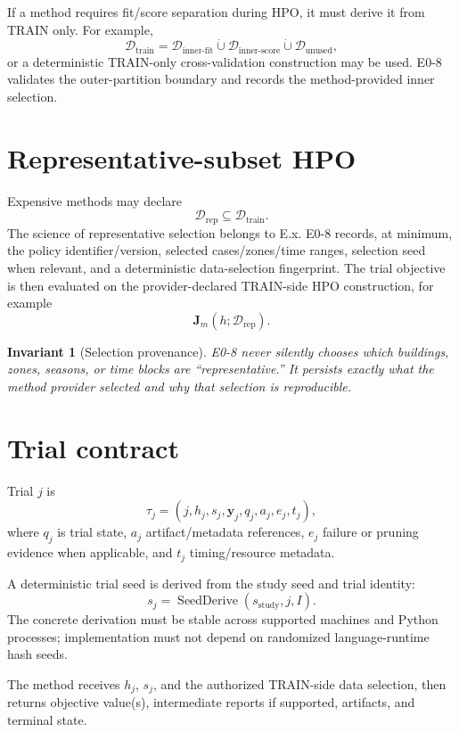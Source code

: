 \documentclass[11pt]{article}
\newcommand{\Trial}{\tau}
\newcommand{\Data}{\mathcal{D}}
\newtheorem{invariant}{Invariant}
\begin{document}
If a method requires fit/score separation during HPO, it must derive it from
TRAIN only. For example,
\[
\Data_{\mathrm{train}}
=
\Data_{\mathrm{inner\mbox{-}fit}}
\dot\cup
\Data_{\mathrm{inner\mbox{-}score}}
\dot\cup
\Data_{\mathrm{unused}},
\]
or a deterministic TRAIN-only cross-validation construction may be used. E0-8
validates the outer-partition boundary and records the method-provided inner
selection.

\section{Representative-subset HPO}

Expensive methods may declare
\[
\Data_{\mathrm{rep}}\subseteq\Data_{\mathrm{train}}.
\]
The science of representative selection belongs to E.x. E0-8 records, at
minimum, the policy identifier/version, selected cases/zones/time ranges,
selection seed when relevant, and a deterministic data-selection fingerprint.
The trial objective is then evaluated on the provider-declared TRAIN-side HPO
construction, for example
\[
\mathbf J_m(h;\Data_{\mathrm{rep}}).
\]

\begin{invariant}[Selection provenance]
E0-8 never silently chooses which buildings, zones, seasons, or time blocks are
``representative.'' It persists exactly what the method provider selected and
why that selection is reproducible.
\end{invariant}

\section{Trial contract}

Trial $j$ is
\[
\boxed{
\Trial_j=
(j,h_j,s_j,\mathbf y_j,q_j,a_j,e_j,t_j),
}
\]
where $q_j$ is trial state, $a_j$ artifact/metadata references, $e_j$ failure or
pruning evidence when applicable, and $t_j$ timing/resource metadata.

A deterministic trial seed is derived from the study seed and trial identity:
\[
\boxed{
s_j=\operatorname{SeedDerive}(s_{\mathrm{study}},j,I).
}
\]
The concrete derivation must be stable across supported machines and Python
processes; implementation must not depend on randomized language-runtime hash
seeds.

The method receives $h_j$, $s_j$, and the authorized TRAIN-side data selection,
then returns objective value(s), intermediate reports if supported, artifacts,
and terminal state.
\end{document}
